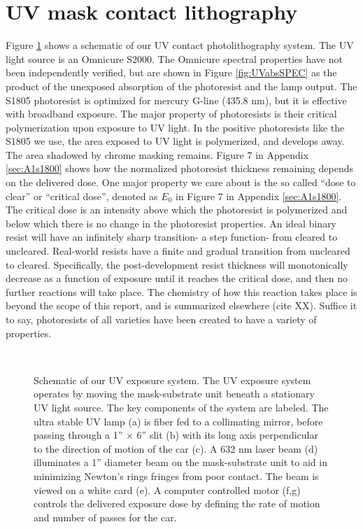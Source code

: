 \section{UV mask contact lithography}
Figure \ref{fig:uvsys} shows a schematic of our UV contact photolithography system.  The UV light source is an Omnicure S2000.  The Omnicure spectral properties have not been independently verified, but are shown in Figure \ref{fig:UVabsSPEC} as the product of the unexposed absorption of the photoresist and the lamp output.  The S1805 photoresist is optimized for mercury G-line (435.8 nm), but it is effective with broadband exposure.  The major property of photoresists is their critical polymerization upon exposure to UV light.  In the positive photoresists like the S1805 we use, the area exposed to UV light is polymerized, and develops away.  The area shadowed by chrome masking remains.  Figure 7 in Appendix \ref{sec:A1s1800} shows how the normalized photoresist thickness remaining depends on the delivered dose.  One major property we care about is the so called ``dose to clear'' or ``critical dose'', denoted as $E_0$ in Figure 7 in Appendix \ref{sec:A1s1800}.  The critical dose is an intensity above which the photoresist is polymerized and below which there is no change in the photoresist properties.  An ideal binary resist will have an infinitely sharp transition- a step function- from cleared to uncleared.  Real-world resists have a finite and gradual transition from uncleared to cleared.  Specifically, the post-development resist thickness will monotonically decrease as a function of exposure until it reaches the critical dose, and then no further reactions will take place.  The chemistry of how this reaction takes place is beyond the scope of this report, and is summarized elsewhere (cite XX).  Suffice it to say, photoresists of all varieties have been created to have a variety of properties.  


\begin{figure}[h!] 
\begin{center}
\ 
\caption[Schematic of our UV exposure system]{Schematic of our UV exposure system.  The UV exposure system operates by moving the mask-substrate unit beneath a stationary UV light source.  The key components of the system are labeled.  The ultra stable UV lamp (a) is fiber fed to a collimating mirror, before passing through a 1'' $\times$ 6'' slit (b) with its long axis perpendicular to the direction of motion of the car (c).  A 632 nm laser beam (d) illuminates a 1'' diameter beam on the mask-substrate unit to aid in minimizing Newton's rings fringes from poor contact.  The beam is viewed on a white card (e).  A computer controlled motor (f,g) controls the delivered exposure dose by defining the rate of motion and number of passes for the car.}
\label{fig:uvsys}
\end{center}
\end{figure}

